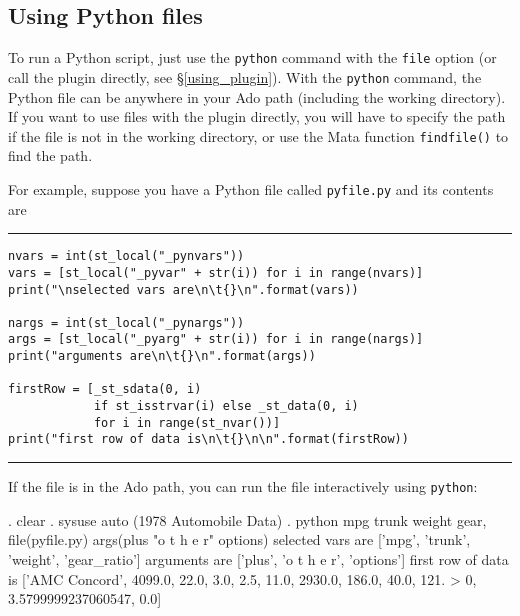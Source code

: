 \documentclass{article}
\begin{document}
\smallskip



\subsection{Using Python files} \label{file_example}

To run a Python script, just use the \lstinline{python} command with the \lstinline{file} option (or call the plugin directly, see \S\ref{using_plugin}). With the \lstinline{python} command, the Python file can be anywhere in your Ado path (including the working directory). If you want to use files with the plugin directly, you will have to specify the path if the file is not in the working directory, or use the Mata function \lstinline{findfile()} to find the path.

For example, suppose you have a Python file called \lstinline$pyfile.py$ and its contents are \newline

\hrule
{\small
\begin{lstlisting}
nvars = int(st_local("_pynvars"))
vars = [st_local("_pyvar" + str(i)) for i in range(nvars)]
print("\nselected vars are\n\t{}\n".format(vars))
    
nargs = int(st_local("_pynargs"))
args = [st_local("_pyarg" + str(i)) for i in range(nargs)]
print("arguments are\n\t{}\n".format(args))

firstRow = [_st_sdata(0, i) 
            if st_isstrvar(i) else _st_data(0, i) 
            for i in range(st_nvar())]
print("first row of data is\n\t{}\n\n".format(firstRow))
\end{lstlisting}}
\hrule

\medskip

\noindent If the file is in the Ado path, you can run the file interactively using \lstinline{python}:

\begin{stlog}
. clear
{\smallskip}
. sysuse auto
(1978 Automobile Data)
{\smallskip}
. python mpg trunk weight gear, file(pyfile.py) args(plus "o t h e r" options)
{\smallskip}
{\smallskip}
selected vars are
        ['mpg', 'trunk', 'weight', 'gear_ratio']
{\smallskip}
{\smallskip}
arguments are
        ['plus', 'o t h e r', 'options']
{\smallskip}
{\smallskip}
first row of data is
        ['AMC Concord', 4099.0, 22.0, 3.0, 2.5, 11.0, 2930.0, 186.0, 40.0, 121.
> 0, 3.5799999237060547, 0.0]
\end{stlog}

\medskip
\end{document}
